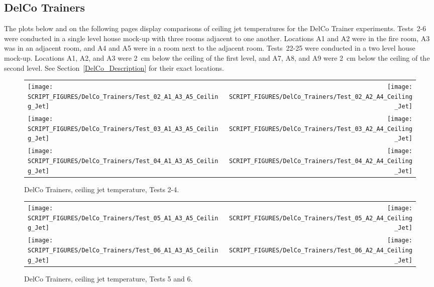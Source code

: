 \subsection{DelCo Trainers}

The plots below and on the following pages display comparisons of ceiling jet temperatures for the DelCo Trainer experiments. Tests~2-6 were conducted in a single level house mock-up with three rooms adjacent to one another. Locations A1 and A2 were in the fire room, A3 was in an adjacent room, and A4 and A5 were in a room next to the adjacent room. Tests~22-25 were conducted in a two level house mock-up. Locations A1, A2, and A3 were 2~cm below the ceiling of the first level, and A7, A8, and A9 were 2~cm below the ceiling of the second level. See Section~\ref{DelCo_Description} for their exact locations.

\begin{figure}[!h]
\begin{tabular*}{\textwidth}{l@{\extracolsep{\fill}}r}
\texttt{[image: SCRIPT\_FIGURES/DelCo\_Trainers/Test\_02\_A1\_A3\_A5\_Ceiling\_Jet]} &
\texttt{[image: SCRIPT\_FIGURES/DelCo\_Trainers/Test\_02\_A2\_A4\_Ceiling\_Jet]} \\
\texttt{[image: SCRIPT\_FIGURES/DelCo\_Trainers/Test\_03\_A1\_A3\_A5\_Ceiling\_Jet]} &
\texttt{[image: SCRIPT\_FIGURES/DelCo\_Trainers/Test\_03\_A2\_A4\_Ceiling\_Jet]} \\
\texttt{[image: SCRIPT\_FIGURES/DelCo\_Trainers/Test\_04\_A1\_A3\_A5\_Ceiling\_Jet]} &
\texttt{[image: SCRIPT\_FIGURES/DelCo\_Trainers/Test\_04\_A2\_A4\_Ceiling\_Jet]}
\end{tabular*}
\caption[DelCo Trainers, ceiling jet temperature, Tests 2-4]
{DelCo Trainers, ceiling jet temperature, Tests 2-4.}
\label{DelCo_Ceiling_Jet_1}
\end{figure}

\newpage

\begin{figure}[p]
\begin{tabular*}{\textwidth}{l@{\extracolsep{\fill}}r}
\texttt{[image: SCRIPT\_FIGURES/DelCo\_Trainers/Test\_05\_A1\_A3\_A5\_Ceiling\_Jet]} &
\texttt{[image: SCRIPT\_FIGURES/DelCo\_Trainers/Test\_05\_A2\_A4\_Ceiling\_Jet]} \\
\texttt{[image: SCRIPT\_FIGURES/DelCo\_Trainers/Test\_06\_A1\_A3\_A5\_Ceiling\_Jet]} &
\texttt{[image: SCRIPT\_FIGURES/DelCo\_Trainers/Test\_06\_A2\_A4\_Ceiling\_Jet]}
\end{tabular*}
\caption[DelCo Trainers, ceiling jet temperature, Tests 5 and 6]
{DelCo Trainers, ceiling jet temperature, Tests 5 and 6.}
\label{DelCo_Ceiling_Jet_2}
\end{figure}

